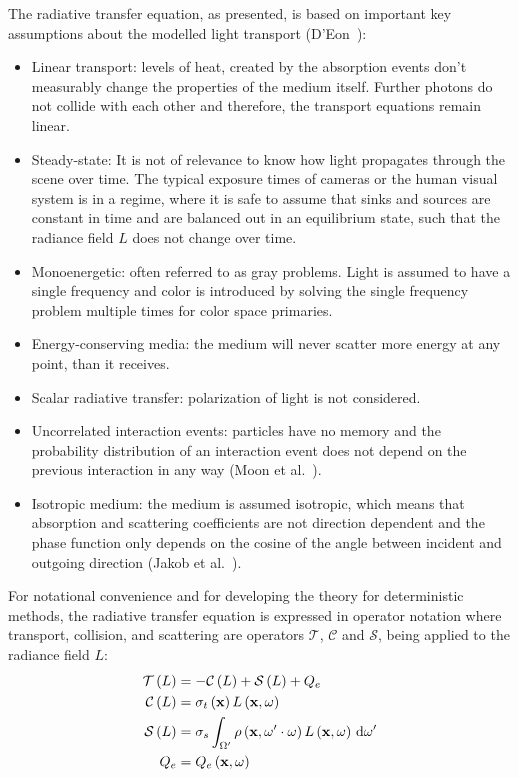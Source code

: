 The radiative transfer equation, as presented, is based on important key assumptions about the modelled light transport (D'Eon~\cite{DEon14}):
\begin{itemize}
\item Linear transport: levels of heat, created by the absorption events don't measurably change the properties of the medium itself. Further photons do not collide with each other and therefore, the transport equations remain linear.
\item Steady-state: It is not of relevance to know how light propagates through the scene over time. The typical exposure times of cameras or the human visual system is in a regime, where it is safe to assume that sinks and sources are constant in time and are balanced out in an equilibrium state, such that the radiance field $L$ does not change over time.
\item Monoenergetic: often referred to as gray problems. Light is assumed to have a single frequency and color is introduced by solving the single frequency problem multiple times for color space primaries.
\item Energy-conserving media: the medium will never scatter more energy at any point, than it receives.
\item Scalar radiative transfer: polarization of light is not considered.
\item Uncorrelated interaction events: particles have no memory and the probability distribution of an interaction event does not depend on the previous interaction in any way (Moon et al.~\cite{Moon07}).
\item Isotropic medium: the medium is assumed isotropic, which means that absorption and scattering coefficients are not direction dependent and the phase function only depends on the cosine of the angle between incident and outgoing direction (Jakob et al.~\cite{Jakob10}).
\end{itemize}

For notational convenience and for developing the theory for deterministic methods, the radiative transfer equation is expressed in operator notation where transport, collision, and scattering are operators $\mathcal{T}$, $\mathcal{C}$ and $\mathcal{S}$, being applied to the radiance field $L$:
\begin{align}
\mathcal{T}\left(L\right) &= -\mathcal{C}\left(L\right) + \mathcal{S}\left(L\right) + Q_e
\label{eq:rte_operator_notation}
\\
\mathcal{C}\left(L\right) &= \sigma_t\left(\mathbf{x}\right) L\left(\mathbf{x}, \omega \right)
\nonumber
\\
\mathcal{S}\left(L\right) &= \sigma_s \int_{\Omega'}\rho\left(\mathbf{x}, \omega'\cdot\omega\right)L\left(\mathbf{x}, \omega \right)\,\mathrm{d}\omega'
\nonumber
\\
Q_e &= Q_e\left(\mathbf{x}, \omega\right)
\nonumber
\end{align}

